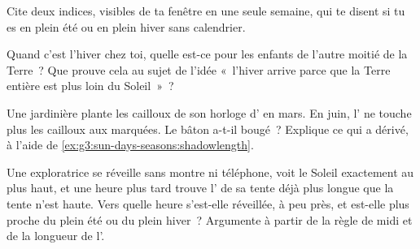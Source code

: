 \begin{exercise}[$\star$]\label{exo:g3:sun-days-seasons:8}
Cite deux indices, visibles de ta fenêtre en une seule semaine, qui
te disent si tu es en plein été ou en plein hiver sans calendrier.
\end{exercise}

\begin{exercise}[$\star$]\label{exo:g3:sun-days-seasons:9}
Quand c'est l'hiver chez toi, quelle  est-ce pour les enfants
de l'autre moitié de la Terre~? Que prouve cela au sujet de l'idée
«~l'hiver arrive parce que la Terre entière est plus loin du
Soleil~»~?
\end{exercise}

\begin{exercise}[$\star\star$]\label{exo:g3:sun-days-seasons:10}
Une jardinière plante les cailloux de son horloge d' en mars. En
juin, l' ne touche plus les cailloux aux  marquées. Le
bâton a-t-il bougé~? Explique ce qui a dérivé, à l'aide de
\cref{ex:g3:sun-days-seasons:shadowlength}.
\end{exercise}

\begin{exercise}[$\star\star$]\label{exo:g3:sun-days-seasons:11}
Une exploratrice se réveille sans montre ni téléphone, voit le Soleil
exactement au plus haut, et une heure plus tard trouve l' de sa
tente déjà plus longue que la tente n'est haute. Vers quelle heure
s'est-elle réveillée, à peu près, et est-elle plus proche du plein
été ou du plein hiver~? Argumente à partir de la règle de midi et de
la longueur de l'.
\end{exercise}
